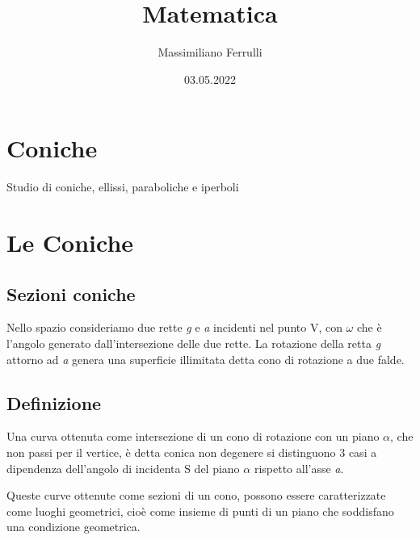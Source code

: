\documentclass[a4paper,11pt]{article}
\begin{document}
\title{Matematica}

\author{Massimiliano Ferrulli}
\date{03.05.2022}



\maketitle

\section*{Coniche}
Studio di coniche, ellissi, paraboliche e iperboli

\pagebreak




\tableofcontents





\pagebreak















\section{Le Coniche }
\subsection{Sezioni coniche}
Nello spazio consideriamo due rette \textit{g} e \textit{a} incidenti nel punto V, con \( \omega \) che è l'angolo generato dall'intersezione delle due rette. 
La rotazione della retta \textit{g} attorno ad \textit{a} genera una superficie illimitata detta cono di rotazione a due falde.






\subsection{Definizione}
Una curva ottenuta come intersezione di un cono di rotazione con un piano \( \alpha \), che non passi per il vertice, è detta conica non degenere
si distinguono 3 casi a dipendenza dell'angolo di incidenta S del piano \( \alpha \) rispetto all'asse \textit{a}. 

Queste curve ottenute come sezioni di un cono, possono essere caratterizzate come luoghi geometrici, cioè come insieme di punti di un piano che soddisfano una condizione geometrica.
 
\end{document}
